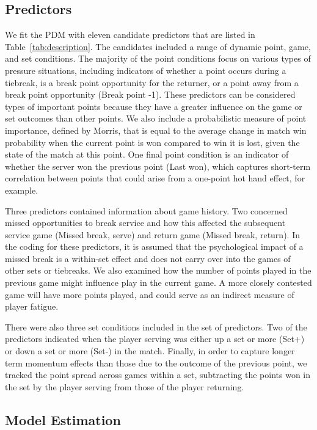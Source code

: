 \documentclass{Latex/svjour3}
\begin{document}
\subsection{Predictors}

We fit the PDM with eleven candidate predictors that are listed in
Table~\ref{tab:description}. The candidates included a range of dynamic point,
game, and set conditions. The majority of the point conditions focus on various
types of pressure situations, including indicators of whether a point occurs
during a tiebreak, is a break point opportunity for the returner, or a point
away from a break point opportunity (Break point -1). These predictors can be
considered types of important points because they have a greater influence on
the game or set outcomes than other points. We also include a probabilistic
measure of point importance, defined by Morris\cite{morris1977most}, that is
equal to the average change in match win probability when the current point is
won compared to win it is lost, given the state of the match at this point. One
final point condition is an indicator of whether the server won the previous
point (Last won), which captures short-term correlation between points that
could arise from a one-point hot hand effect, for example.

Three predictors contained information about game history. Two concerned missed
opportunities to break service and how this affected the subsequent service game
(Missed break, serve) and return game (Missed break, return). In the coding for
these predictors, it is assumed that the psychological impact of a missed break
is a within-set effect and does not carry over into the games of other sets or
tiebreaks.  We also examined how the number of points played in the previous
game might influence play in the current game. A more closely contested game
will have more points played, and could serve as an indirect measure of player
fatigue.

There were also three set conditions included in the set of predictors. Two of
the predictors indicated when the player serving was either up a set or more
(Set+) or down a set or more (Set-) in the match. Finally, in order to capture
longer term momentum effects than those due to the outcome of the previous
point, we tracked the point spread across games within a set, subtracting the
points won in the set by the player serving from those of the player returning.


\subsection{Model Estimation}
\end{document}
